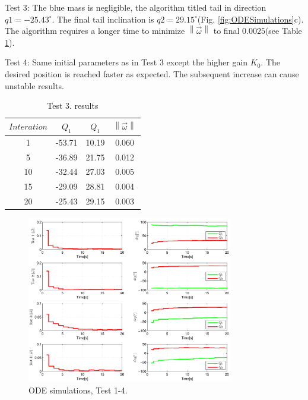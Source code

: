 Test 3: The blue mass is negligible, the algorithm titled tail in direction $q1=-25.43^{\circ}$. The final tail inclination is $q2=29.15^{\circ}$(Fig. \ref{fig:ODESimulations}c). The algorithm requires a longer time to minimize $\left \| \vec{\omega} \right \|$ to final $0.0025$(see Table \ref{tab:Simulations2}).

Test 4: Same initial parameters as in Test 3 except the higher gain $K_0$. The desired position is reached faster as expected. The subsequent increase can cause unstable results. 

\begin{table}
	\centering
\begin{tabular}{|c|c|c|c|}
	\hline
$Interation$ & $Q_1$ & $Q_1$  & $\left \| \vec{\omega} \right \|$\\
	\hline
1 & -53.71 & 10.19 & 0.060\\
5 & -36.89 & 21.75 & 0.012\\
10 & -32.44 & 27.03 &  0.005\\
15 & -29.09 & 28.81 & 0.004\\
20 & -25.43 & 29.15 &  0.003\\
\hline
\end{tabular}
\caption{Test 3. results}\label{tab:Simulations2}
\end{table}

\begin{figure}
	\centering
	\includegraphics[width=90mm]{./pictures/ODE_graph.pdf}
	\caption{ODE simulations, Test 1-4.}
	\label{fig:ODE graph}
\end{figure}


